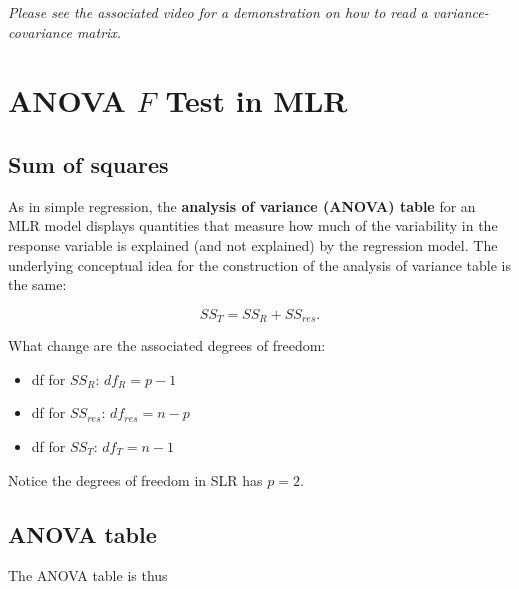 \documentclass[
]{book}
\providecommand{\tightlist}{%
  \setlength{\itemsep}{0pt}\setlength{\parskip}{0pt}}
\begin{document}
\emph{Please see the associated video for a demonstration on how to read a variance-covariance matrix.}

\hypertarget{anova-f-test-in-mlr}{%
\section{\texorpdfstring{ANOVA \(F\) Test in MLR}{ANOVA F Test in MLR}}\label{anova-f-test-in-mlr}}

\hypertarget{sum-of-squares-1}{%
\subsection{Sum of squares}\label{sum-of-squares-1}}

As in simple regression, the \textbf{analysis of variance (ANOVA) table} for an MLR model displays quantities that measure how much of the variability in the response variable is explained (and not explained) by the regression model. The underlying conceptual idea for the construction of the analysis of variance table is the same:

\begin{equation} 
SS_T = SS_R + SS_{res}.
\label{eq:6SS}
\end{equation}

What change are the associated degrees of freedom:

\begin{itemize}
\tightlist
\item
  df for \(SS_R\): \(df_R = p-1\)
\item
  df for \(SS_{res}\): \(df_{res} = n-p\)
\item
  df for \(SS_T\): \(df_T = n-1\)
\end{itemize}

Notice the degrees of freedom in SLR has \(p=2\).

\hypertarget{anova-table-2}{%
\subsection{ANOVA table}\label{anova-table-2}}

The ANOVA table is thus
\end{document}
